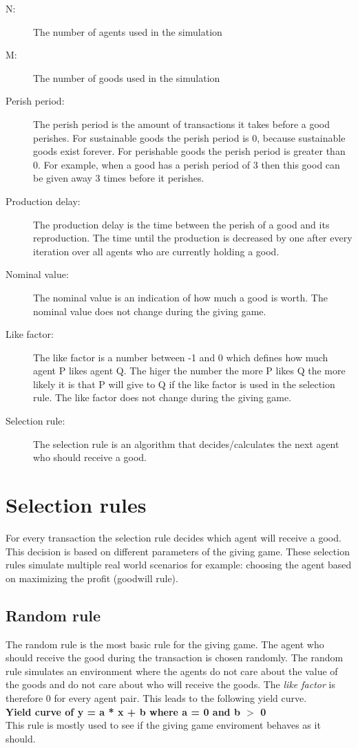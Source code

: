 \documentclass[twoside,openright]{uva-bachelor-thesis}
\begin{document}
\begin{description}
  \item[N:] The number of agents used in the simulation
  \item[M:] The number of goods used in the simulation
  \item[Perish period:] The perish period is the amount of transactions it takes before a good perishes. For sustainable goods the perish period is 0, because sustainable goods exist forever. For perishable goods the perish period is greater than 0. For example, when a good has a perish period of 3 then this good can be given away 3 times before it perishes.
  \item[Production delay:] The production delay is the time between the perish of a good and its reproduction. The time until the production is decreased by one after every iteration over all agents who are currently holding a good.
  \item[Nominal value:] The nominal value is an indication of how much a good is worth. The nominal value does not change during the giving game.
  \item[Like factor:] The like factor is a number between -1 and 0 which defines how much agent P likes agent Q. The higer the number the more P likes Q the more likely it is that P will give to Q if the like factor is used in the selection rule. The like factor does not change during the giving game.
  \item[Selection rule:] The selection rule is an algorithm that decides/calculates the next agent who should receive a good.

\end{description}

\chapter{Selection rules}
For every transaction the selection rule decides which agent will receive a good. This decision is based on different parameters of the giving game. These selection rules simulate  multiple real world scenarios for example: choosing the agent based on maximizing the profit (goodwill rule).

\section{Random rule}
The random rule is the most basic rule for the giving game. The agent who should receive the good during the transaction is chosen randomly. The random rule simulates an environment where the agents do not care about the value of the goods and do not care about who will receive the goods. The \textit{like factor} is therefore 0 for every agent pair. This leads to the following yield curve.
\\
\textbf{Yield curve of y = a * x + b where a = 0 and b $>$ 0}
\\
This rule is mostly used to see if the giving game enviroment behaves as it should.
\end{document}
